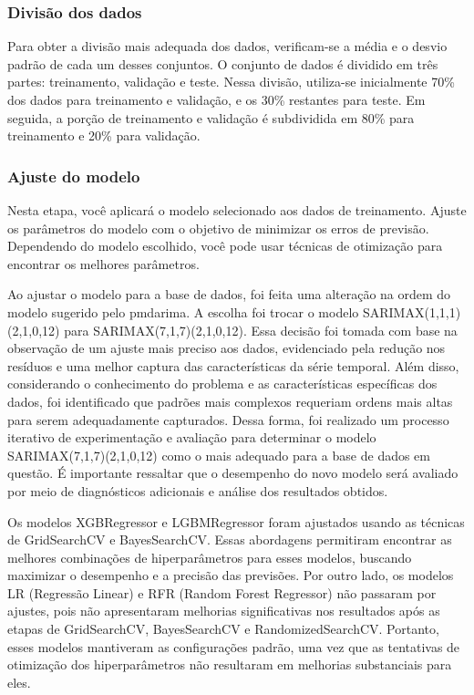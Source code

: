 \subsubsection{Divis\~ao dos dados}


Para obter a divisão mais adequada dos dados, verificam-se a média e o desvio padrão de cada um desses conjuntos. O conjunto de dados é dividido em três partes: treinamento, validação e teste. Nessa divisão, utiliza-se inicialmente 70\% dos dados para treinamento e validação, e os 30\% restantes para teste. Em seguida, a porção de treinamento e validação é subdividida em 80\% para treinamento e 20\% para validação.

\subsubsection{Ajuste do modelo}
Nesta etapa, você aplicará o modelo selecionado aos dados de treinamento. Ajuste os parâmetros do modelo com o objetivo de minimizar os erros de previsão. Dependendo do modelo escolhido, você pode usar técnicas de otimização para encontrar os melhores parâmetros.

Ao ajustar o modelo para a base de dados, foi feita uma alteração na ordem do modelo sugerido pelo pmdarima. A escolha foi trocar o modelo SARIMAX(1,1,1)(2,1,0,12) para SARIMAX(7,1,7)(2,1,0,12). Essa decisão foi tomada com base na observação de um ajuste mais preciso aos dados, evidenciado pela redução nos resíduos e uma melhor captura das características da série temporal. Além disso, considerando o conhecimento do problema e as características específicas dos dados, foi identificado que padrões mais complexos requeriam ordens mais altas para serem adequadamente capturados. Dessa forma, foi realizado um processo iterativo de experimentação e avaliação para determinar o modelo SARIMAX(7,1,7)(2,1,0,12) como o mais adequado para a base de dados em questão. É importante ressaltar que o desempenho do novo modelo será avaliado por meio de diagnósticos adicionais e análise dos resultados obtidos.

Os modelos XGBRegressor e LGBMRegressor foram ajustados usando as técnicas de GridSearchCV e BayesSearchCV. Essas abordagens permitiram encontrar as melhores combinações de hiperparâmetros para esses modelos, buscando maximizar o desempenho e a precisão das previsões. Por outro lado, os modelos LR (Regressão Linear) e RFR (Random Forest Regressor) não passaram por ajustes, pois não apresentaram melhorias significativas nos resultados após as etapas de GridSearchCV, BayesSearchCV e RandomizedSearchCV. Portanto, esses modelos mantiveram as configurações padrão, uma vez que as tentativas de otimização dos hiperparâmetros não resultaram em melhorias substanciais para eles.

